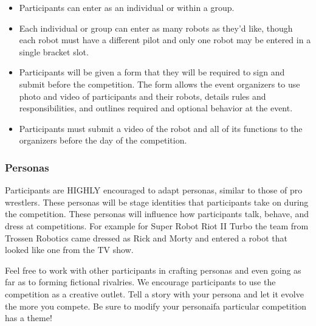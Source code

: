 \documentclass{article}
\begin{document}
		\begin{itemize}
		
 			\item Participants can enter as an individual or within a group.
  			\item  Each individual or group can enter as many robots as they'd like, though each robot must have a different pilot and only one robot may be entered in a single bracket slot.
 			\item Participants will be given a form that they will be required to sign and submit before the
competition. The form allows the event organizers to use photo and video of participants and their robots, details rules and responsibilities, and outlines required and optional behavior at the event.
  			\item Participants must submit a video of the robot and all of its functions to the organizers before the day of the competition.
		\end{itemize}

	   \subsubsection {Personas}	
			Participants are HIGHLY encouraged to adapt personas, similar to those of pro wrestlers. These personas will be stage identities that participants take on during the competition. These personas will influence how participants talk, behave, and dress at competitions. For example for Super Robot Riot II Turbo the team from Trossen Robotics came dressed as Rick and Morty and entered a robot that looked like one from the TV show.
			
			Feel free to work with other participants in crafting personas and even going as far as to forming fictional rivalries. We encourage participants to use the competition as a creative outlet. Tell a story with your persona and let it evolve the more you compete. Be sure to modify your personaifa particular competition has a theme!

	
\end{document}
